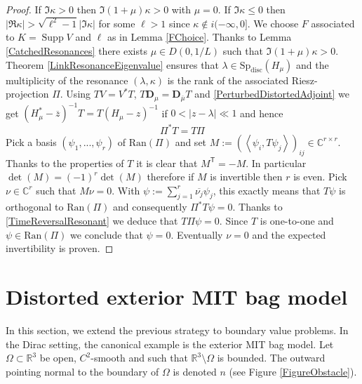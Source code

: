 \documentclass[a4paper, 12pt]{amsart}
\numberwithin{equation}{section}
\newcommand{\C}{\mathbb{C}} %
\newcommand{\R}{\mathbb{R}} %
\newcommand{\Ran}{\mathrm{Ran}} %
\newcommand{\Sp}{\mathrm{Sp}} %
\newcommand{\disc}{\mathrm{disc}} %
\newcommand{\la}{\left\langle} %
\newcommand{\ra}{\right\rangle} %
\newcommand{\lv}{\left\vert} %
\newcommand{\rv}{\right\vert} %
\newcommand{\Dvec}{\mathbf{D}}
\newcommand{\Tsf}{\mathsf{T}} %
\DeclareMathOperator{\Supp}{\mathrm{Supp}} %
\begin{document}
\begin{proof}
    If $\Im\kappa>0$ then $\Im(1+\mu)\kappa>0$ with $\mu=0$. If $\Im\kappa\leq 0$ then $\lv\Re\kappa\rv>\sqrt{\ell^2-1}\lv\Im\kappa\rv$ for some $\ell>1$ since $\kappa\not\in i(-\infty,0]$. We choose $F$ associated to $K=\Supp V$ and $\ell$ as in Lemma \ref{FChoice}. Thanks to Lemma \ref{CatchedResonances} there exists $\mu\in D(0,1/L)$ such that $\Im(1+\mu)\kappa>0$. Theorem \ref{LinkResonanceEigenvalue} ensures that $\lambda\in\Sp_\disc(H_\mu)$ and the multiplicity of the resonance $(\lambda,\kappa)$ is the rank of the associated Riesz-projection $\Pi$. Using $TV=V^*T$, $T\Dvec_\mu=\Dvec_{\overline{\mu}}T$ and \eqref{PerturbedDistortedAdjoint} we get 
    $(H_\mu^*-\overline{z})^{-1}T=T(H_\mu-z)^{-1}$ if $0<\lv z-\lambda\rv\ll1$ and hence
    \begin{equation}\label{TimeReversalResonant}
        \Pi^*T=T\Pi
    \end{equation}
    Pick a basis $(\psi_1,...,\psi_r)$ of $\Ran(\Pi)$ and set $M:=(\la \psi_i,T \psi_j\ra)_{ij}\in\C^{r\times r}$. Thanks to the properties of $T$ it is clear that $M^\Tsf=-M$. In particular $\det(M)=(-1)^r\det(M)$ therefore if $M$ is invertible then $r$ is even. Pick $\nu\in\C^r$ such that $M\nu=0$. With $\psi:=\sum_{j=1}^r\overline{\nu_j}\psi_j$, this exactly means that $T\psi$ is orthogonal to $\Ran(\Pi)$ and consequently $\Pi^*T\psi=0$. Thanks to \eqref{TimeReversalResonant} we deduce that 
    $T\Pi\psi=0$. Since $T$ is one-to-one and $\psi\in\Ran(\Pi)$ we conclude that $\psi=0$. Eventually $\nu=0$ and the expected invertibility is proven.
\end{proof}

\section{Distorted exterior MIT bag model}\label{Section4}

In this section, we extend the previous strategy to boundary value problems. In the Dirac setting, the canonical example is the exterior MIT bag model. Let $\Omega\subset\R^3$ be open, $ C^2$-smooth and such that $\R^3\setminus\Omega$ is bounded. The outward pointing normal to the boundary of $\Omega$ is denoted $n$ (see Figure \ref{FigureObstacle}).
\end{document}
